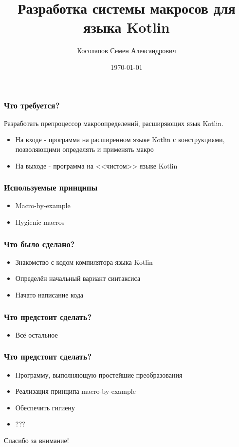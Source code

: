 \documentclass[11pt]{beamer}
\author[Косолапов С.А.]{Косолапов Семен Александрович}
\title[Промежуточная аттестация 2]{Разработка системы макросов для языка Kotlin}
\date{\today}
\institute[СПбПУ]{
Руководитель: Беляев М.А.
}
\begin{document}
\begin{frame}
\titlepage
\end{frame}


\begin{frame}
\frametitle{Что требуется?}

Разработать препроцессор макроопределений, расширяющих язык Kotlin.

\begin{itemize}
	\item На входе - программа на расширенном языке Kotlin с конструкциями, позволяющими определять и применять макро
	\item На выходе - программа на <<чистом>> языке Kotlin
\end{itemize}

\end{frame}


\begin{frame}
\frametitle{Используемые принципы}

\begin{itemize}
	\item Macro-by-example
	\item Hygienic macros
\end{itemize}

\end{frame}


\begin{frame}
\frametitle{Что было сделано?}

\begin{itemize}
	\item Знакомство с кодом компилятора языка Kotlin
	\item Определён начальный вариант синтаксиса
	\item Начато написание кода
\end{itemize}

\end{frame}


\begin{frame}
\frametitle{Что предстоит сделать?}
\begin{itemize}
	\item Всё остальное
\end{itemize}	
\end{frame}


\begin{frame}
\frametitle{Что предстоит сделать?}
\begin{itemize}
	\item Программу, выполняющую простейшие преобразования
	\item Реализация принципа macro-by-example
	\item Обеспечить гигиену
	\item ???
\end{itemize}	
\end{frame}


\begin{frame}
\huge{\centerline{Спасибо за внимание!}}
\end{frame}
\end{document}
